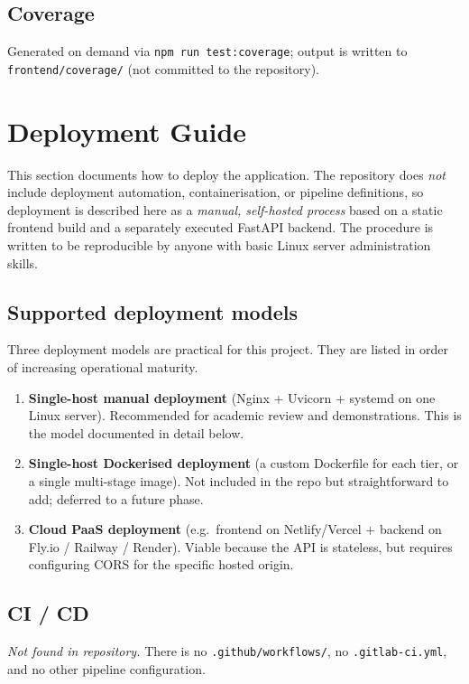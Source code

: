 \documentclass[11pt,a4paper]{article}
\begin{document}
\subsection{Coverage}
Generated on demand via \texttt{npm run test:coverage}; output is written to
\texttt{frontend/coverage/} (not committed to the repository).

\section{Deployment Guide}
\label{sec:deploy}

This section documents how to deploy the application. The repository does
\emph{not} include deployment automation, containerisation, or pipeline
definitions, so deployment is described here as a \emph{manual, self-hosted
process} based on a static frontend build and a separately executed FastAPI
backend. The procedure is written to be reproducible by anyone with basic
Linux server administration skills.

\subsection{Supported deployment models}
\label{subsec:supported_deployment_models}

Three deployment models are practical for this project. They are listed in
order of increasing operational maturity.

\begin{enumerate}[leftmargin=1.6em]
  \item \textbf{Single-host manual deployment} (Nginx + Uvicorn
        + systemd on one Linux server). Recommended for academic review
        and demonstrations. This is the model documented in detail below.
  \item \textbf{Single-host Dockerised deployment} (a custom Dockerfile for
        each tier, or a single multi-stage image). Not included in the repo
        but straightforward to add; deferred to a future phase.
  \item \textbf{Cloud PaaS deployment} (e.g.\ frontend on Netlify/Vercel +
        backend on Fly.io / Railway / Render). Viable because the API is
        stateless, but requires configuring CORS for the specific hosted
        origin.
\end{enumerate}

\subsection{CI / CD}
\emph{Not found in repository.} There is no \texttt{.github/workflows/}, no
\texttt{.gitlab-ci.yml}, and no other pipeline configuration.
\end{document}
